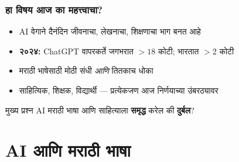\begin{frame}[fragile]\frametitle{हा विषय आज का महत्त्वाचा?}

\begin{itemize}
\item AI वेगाने दैनंदिन जीवनाचा, लेखनाचा, शिक्षणाचा भाग बनत आहे
\item \textbf{२०२४:} ChatGPT वापरकर्ते जगभरात $> 18$ कोटी; भारतात $> 2$ कोटी
\item मराठी भाषेसाठी मोठी संधी \textit{आणि} तितकाच धोका
\item साहित्यिक, शिक्षक, विद्यार्थी — प्रत्येकजण आज निर्णयाच्या उंबरठ्यावर
\end{itemize}

\vspace{0.2cm}
\begin{alertblock}{मुख्य प्रश्न}
AI मराठी भाषा आणि साहित्याला \textbf{समृद्ध} करेल की \textbf{दुर्बल}?
\end{alertblock}


\end{frame}

\section{AI आणि मराठी भाषा}

